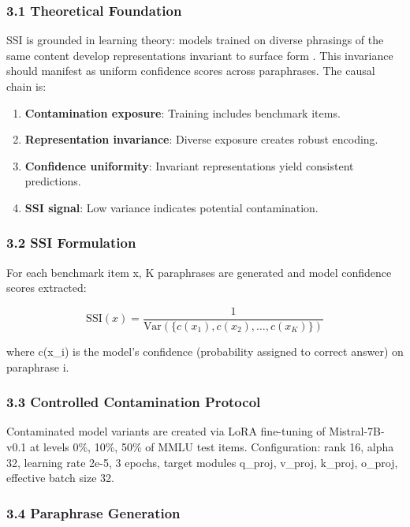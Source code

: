 
\subsubsection{3.1 Theoretical Foundation}

SSI is grounded in learning theory: models trained on diverse phrasings of the same content develop representations invariant to surface form \citep{blum1998combining}. This invariance should manifest as uniform confidence scores across paraphrases. The causal chain is:

\begin{enumerate}
\item \textbf{Contamination exposure}: Training includes benchmark items.
\item \textbf{Representation invariance}: Diverse exposure creates robust encoding.
\item \textbf{Confidence uniformity}: Invariant representations yield consistent predictions.
\item \textbf{SSI signal}: Low variance indicates potential contamination.
\end{enumerate}

\subsubsection{3.2 SSI Formulation}

For each benchmark item x, K paraphrases are generated and model confidence scores extracted:

$$\text{SSI}(x) = \frac{1}{\text{Var}(\{c(x_1), c(x_2), \ldots, c(x_K)\})}$$

where c(x\_i) is the model's confidence (probability assigned to correct answer) on paraphrase i.

\subsubsection{3.3 Controlled Contamination Protocol}

Contaminated model variants are created via LoRA fine-tuning \citep{hu2022lora} of Mistral-7B-v0.1 at levels 0\%, 10\%, 50\% of MMLU test items. Configuration: rank 16, alpha 32, learning rate 2e-5, 3 epochs, target modules q\_proj, v\_proj, k\_proj, o\_proj, effective batch size 32.

\subsubsection{3.4 Paraphrase Generation}

